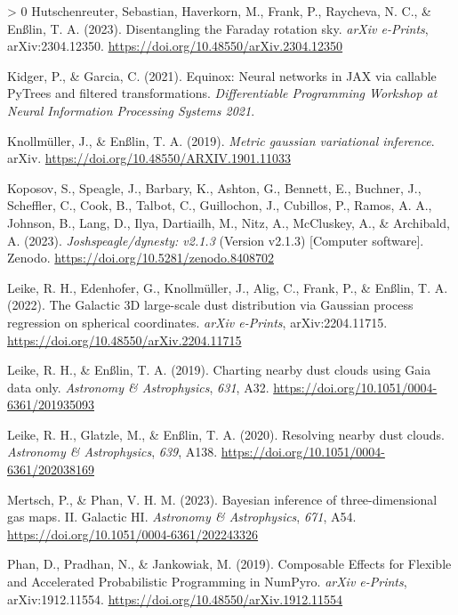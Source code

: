 \documentclass[10pt,a4paper,onecolumn]{article}
\newlength{\cslhangindent}
\newenvironment{CSLReferences}[3] %
 {%
  \setlength{\parindent}{0pt}
  \ifodd #1 \everypar{\setlength{\hangindent}{\cslhangindent}}\ignorespaces\fi
  \ifnum #2 > 0
  \setlength{\parskip}{#2\baselineskip}
  \fi
 }%
 {}
\begin{document}
\begin{CSLReferences}{1}{0}
\leavevmode\hypertarget{ref-Hutschenreuter2023}{}%
Hutschenreuter, Sebastian, Haverkorn, M., Frank, P., Raycheva, N. C., \&
Enßlin, T. A. (2023). {Disentangling the Faraday rotation sky}.
\emph{arXiv e-Prints}, arXiv:2304.12350.
\url{https://doi.org/10.48550/arXiv.2304.12350}

\leavevmode\hypertarget{ref-Kidger2021}{}%
Kidger, P., \& Garcia, C. (2021). {E}quinox: Neural networks in {JAX}
via callable {P}y{T}rees and filtered transformations.
\emph{Differentiable Programming Workshop at Neural Information
Processing Systems 2021}.

\leavevmode\hypertarget{ref-Knollmueller2019}{}%
Knollmüller, J., \& Enßlin, T. A. (2019). \emph{Metric gaussian
variational inference}. arXiv.
\url{https://doi.org/10.48550/ARXIV.1901.11033}

\leavevmode\hypertarget{ref-Koposov2023}{}%
Koposov, S., Speagle, J., Barbary, K., Ashton, G., Bennett, E., Buchner,
J., Scheffler, C., Cook, B., Talbot, C., Guillochon, J., Cubillos, P.,
Ramos, A. A., Johnson, B., Lang, D., Ilya, Dartiailh, M., Nitz, A.,
McCluskey, A., \& Archibald, A. (2023). \emph{Joshspeagle/dynesty:
v2.1.3} (Version v2.1.3) {[}Computer software{]}. Zenodo.
\url{https://doi.org/10.5281/zenodo.8408702}

\leavevmode\hypertarget{ref-Leike2022}{}%
Leike, R. H., Edenhofer, G., Knollmüller, J., Alig, C., Frank, P., \&
Enßlin, T. A. (2022). {The Galactic 3D large-scale dust distribution via
Gaussian process regression on spherical coordinates}. \emph{arXiv
e-Prints}, arXiv:2204.11715.
\url{https://doi.org/10.48550/arXiv.2204.11715}

\leavevmode\hypertarget{ref-Leike2019}{}%
Leike, R. H., \& Enßlin, T. A. (2019). {Charting nearby dust clouds
using Gaia data only}. \emph{Astronomy \& Astrophysics}, \emph{631},
A32. \url{https://doi.org/10.1051/0004-6361/201935093}

\leavevmode\hypertarget{ref-Leike2020}{}%
Leike, R. H., Glatzle, M., \& Enßlin, T. A. (2020). {Resolving nearby
dust clouds}. \emph{Astronomy \& Astrophysics}, \emph{639}, A138.
\url{https://doi.org/10.1051/0004-6361/202038169}

\leavevmode\hypertarget{ref-Mertsch2023}{}%
Mertsch, P., \& Phan, V. H. M. (2023). {Bayesian inference of
three-dimensional gas maps. II. Galactic HI}. \emph{Astronomy \&
Astrophysics}, \emph{671}, A54.
\url{https://doi.org/10.1051/0004-6361/202243326}

\leavevmode\hypertarget{ref-Phan2019}{}%
Phan, D., Pradhan, N., \& Jankowiak, M. (2019). {Composable Effects for
Flexible and Accelerated Probabilistic Programming in NumPyro}.
\emph{arXiv e-Prints}, arXiv:1912.11554.
\url{https://doi.org/10.48550/arXiv.1912.11554}


\end{CSLReferences}
\end{document}
